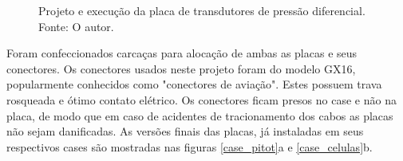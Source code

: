 \begin{figure}[!ht]
    \centering
    \caption{Projeto e execução da placa de transdutores de pressão diferencial. Fonte: O autor.}
        \label{projeto_pcb_celulas}
        \qquad
        \label{placa_pcb_celulas}
\end{figure}

Foram confeccionados carcaças para alocação de ambas as placas e seus conectores. Os conectores usados neste projeto foram do modelo GX16, popularmente conhecidos como "conectores de aviação". Estes possuem trava rosqueada e ótimo contato elétrico. Os conectores ficam presos no case e não na placa, de modo que em caso de acidentes de tracionamento dos cabos as placas não sejam danificadas. As versões finais das placas, já instaladas em seus respectivos cases são mostradas nas figuras \ref{case_pitot}a e \ref{case_celulas}b.

